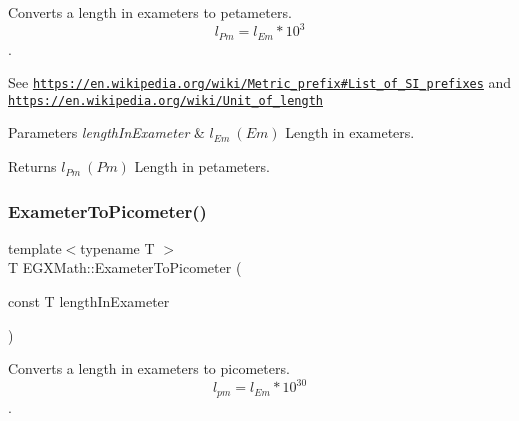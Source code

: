 Converts a length in exameters to petameters. \[ l_{Pm}=l_{Em} * 10^{3} \]. 

See \href{https://en.wikipedia.org/wiki/Metric_prefix#List_of_SI_prefixes}{\tt https\+://en.\+wikipedia.\+org/wiki/\+Metric\+\_\+prefix\#\+List\+\_\+of\+\_\+\+S\+I\+\_\+prefixes} and \href{https://en.wikipedia.org/wiki/Unit_of_length}{\tt https\+://en.\+wikipedia.\+org/wiki/\+Unit\+\_\+of\+\_\+length} 
\begin{DoxyParams}{Parameters}
{\em length\+In\+Exameter} & $ l_{Em}\ (Em)$ Length in exameters. \\
\hline
\end{DoxyParams}
\begin{DoxyReturn}{Returns}
$ l_{Pm}\ (Pm)$ Length in petameters. 
\end{DoxyReturn}
\mbox{\label{group___e_g_x_math-_conversions-_length_conversions-_exameter-_s_i_gaf524e8324fedf2eb61d43ce1dc36bcac}} 
\subsubsection{\texorpdfstring{Exameter\+To\+Picometer()}{ExameterToPicometer()}}
{\footnotesize\ttfamily template$<$typename T $>$ \\
T E\+G\+X\+Math\+::\+Exameter\+To\+Picometer (\begin{DoxyParamCaption}\item[{const T}]{length\+In\+Exameter }\end{DoxyParamCaption})}



Converts a length in exameters to picometers. \[ l_{pm}=l_{Em} * 10^{30} \]. 

